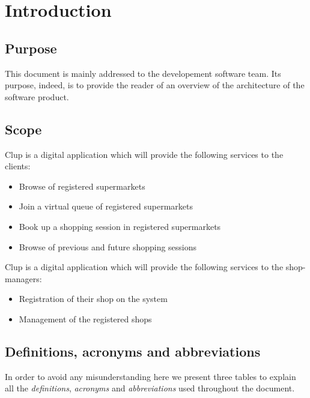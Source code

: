 \section{Introduction}
\label{sect:introduction}

\subsection{Purpose}
\label{subsect:purpose}
This document is mainly addressed to the developement software team. 
Its purpose, indeed, is to provide the reader of an overview of the architecture of the software product.

\subsection{Scope}
\label{subsect:scope}

Clup is a digital application which will provide the following services to the clients:
\begin{itemize}
    \item Browse of registered supermarkets
    \item Join a virtual queue of registered supermarkets 
    \item Book up a shopping session in registered supermarkets 
    \item Browse of previous and future shopping sessions 
\end{itemize}
Clup is a digital application which will provide the following services to the shop-managers:
\begin{itemize}
    \item Registration of their shop on the system
    \item Management of the registered shops
\end{itemize}


\subsection{Definitions, acronyms and abbreviations}
\label{subsect:definitionsacronymsabbreviations}

In order to avoid any misunderstanding here we present three tables to explain all the \textit{definitions}, \textit{acronyms} and \textit{abbreviations} used throughout the document.

